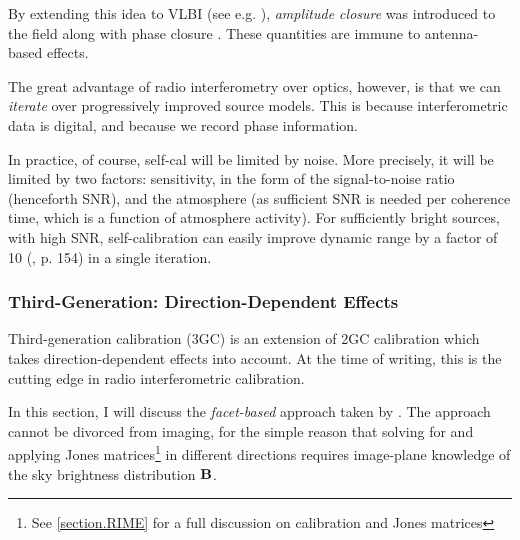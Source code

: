 \pg
By extending this idea to VLBI (see e.g.  ), \emph{amplitude closure} was introduced to the field along with phase closure . These quantities are immune to antenna-based effects.%

\pg
The great advantage of radio interferometry over optics, however, is that we can \emph{iterate} over progressively improved source models. This is because interferometric data is digital, and because we record phase information.

\pg
In practice, of course, self-cal will be limited by noise. More precisely, it will be limited by two factors: sensitivity, in the form of the signal-to-noise ratio (henceforth SNR), and the atmosphere (as sufficient SNR is needed per coherence time, which is a function of atmosphere activity). For sufficiently bright sources, with high SNR, self-calibration can easily improve dynamic range by a factor of 10 (\cite{serendipitous}, p. 154) in a single iteration. 

\subsubsection{Third-Generation: Direction-Dependent Effects}

\pg
Third-generation calibration (3GC) is an extension of 2GC calibration which takes direction-dependent effects into account. At the time of writing, this is the cutting edge in radio interferometric calibration.

\pg
In this section, I will discuss the \emph{facet-based} approach taken by . The approach cannot be divorced from imaging, for the simple reason that solving for and applying Jones matrices\footnote{See \cref{section.RIME} for a full discussion on calibration and Jones matrices} in different directions requires image-plane knowledge of the sky brightness distribution $\textbf{B}$. %

